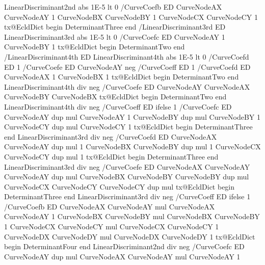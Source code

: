 {{        LinearDiscriminant2nd abs 1E-5 lt { %
          0 /CurveCoefb ED
          CurveNodeAX CurveNodeAY 1
          CurveNodeBX CurveNodeBY 1
          CurveNodeCX CurveNodeCY 1
          tx@EcldDict begin DeterminantThree end /LinearDiscriminant3rd ED
          LinearDiscriminant3rd abs 1E-5 lt { %
            0 /CurveCoefc ED
            CurveNodeAY 1
            CurveNodeBY 1
            tx@EcldDict begin DeterminantTwo end /LinearDiscriminant4th ED
            LinearDiscriminant4th abs 1E-5 lt { %
              0 /CurveCoefd ED
              1 /CurveCoefe ED
              CurveNodeAY neg /CurveCoeff ED
            } {
              1 /CurveCoefd ED
              CurveNodeAX 1
              CurveNodeBX 1
              tx@EcldDict begin DeterminantTwo end LinearDiscriminant4th div neg /CurveCoefe ED
              CurveNodeAY CurveNodeAX
              CurveNodeBY CurveNodeBX
              tx@EcldDict begin DeterminantTwo end LinearDiscriminant4th div neg /CurveCoeff ED
            } ifelse
          } {
            1 /CurveCoefc ED
            CurveNodeAY dup mul CurveNodeAY 1
            CurveNodeBY dup mul CurveNodeBY 1
            CurveNodeCY dup mul CurveNodeCY 1
            tx@EcldDict begin DeterminantThree end LinearDiscriminant3rd div neg /CurveCoefd ED
            CurveNodeAX CurveNodeAY dup mul 1
            CurveNodeBX CurveNodeBY dup mul 1
            CurveNodeCX CurveNodeCY dup mul 1
            tx@EcldDict begin DeterminantThree end LinearDiscriminant3rd div neg /CurveCoefe ED
            CurveNodeAX CurveNodeAY CurveNodeAY dup mul
            CurveNodeBX CurveNodeBY CurveNodeBY dup mul
            CurveNodeCX CurveNodeCY CurveNodeCY dup mul
            tx@EcldDict begin DeterminantThree end LinearDiscriminant3rd div neg /CurveCoeff ED
          } ifelse
        } {
          1 /CurveCoefb ED
          CurveNodeAX CurveNodeAY mul CurveNodeAX CurveNodeAY 1
          CurveNodeBX CurveNodeBY mul CurveNodeBX CurveNodeBY 1
          CurveNodeCX CurveNodeCY mul CurveNodeCX CurveNodeCY 1
          CurveNodeDX CurveNodeDY mul CurveNodeDX CurveNodeDY 1
          tx@EcldDict begin DeterminantFour end LinearDiscriminant2nd div neg /CurveCoefc ED
          CurveNodeAY dup mul CurveNodeAX CurveNodeAY mul CurveNodeAY 1
}}}
